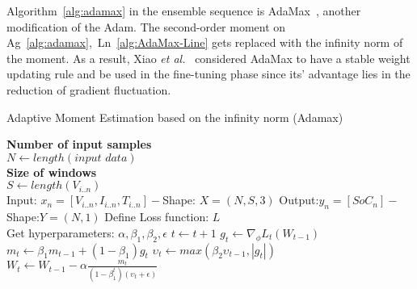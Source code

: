 %
\mbox{Algorithm~\ref{alg:adamax}} in the ensemble sequence is AdaMax~\cite{kingma_adam_2017}, another modification of the Adam.
The second-order moment on \mbox{Ag~\ref{alg:adamax}, Ln~\ref{alg:AdaMax-Line}} gets replaced with the infinity norm of the moment.
As a result, Xiao \textit{et al.}~\cite{xiao_accurate_2019} considered AdaMax to have a stable weight updating rule and be used in the fine-tuning phase since its' advantage lies in the reduction of gradient fluctuation. 
\begin{algorithm}
    \caption{Adaptive Moment Estimation based on the infinity norm (Adamax)}
    \begin{algorithmic}[1]
      \STATE \textbf{Number of input samples} \\ $N\gets length(\textit{input data})$\\
      \STATE \textbf{Size of windows} \\ $S\gets length(V_{i..n})$\\
      \STATE Input: $x_n = [V_{i..n}, I_{i..n}, T_{i..n}] - $Shape: $X = (N, S, 3)$
      \STATE Output:$y_n = [SoC_{n}] - $Shape:$Y = (N, 1)$
      \STATE Define Loss function: $L$ \\
             Get hyperparameters: $\alpha, \beta_1, \beta_2, \epsilon$
      \STATE $t \gets t+1$
      \STATE $g_t \gets \nabla_\phi L_t (W_{t-1})$ 
      \STATE $m_t \gets \beta_1 m_{t-1}+(1-\beta_1) g_t $ 
      \STATE $\upsilon_t \gets max\left(\beta_2\upsilon_{t-1}, |g_t|\right) $ 
      \STATE $W_t \gets W_{t-1}- \alpha \frac{m_t}{(1-\beta^t_1)(\upsilon_t+\epsilon)} $ 
      \ENDWHILE
    \end{algorithmic}
    \label{alg:adamax}
\end{algorithm}

